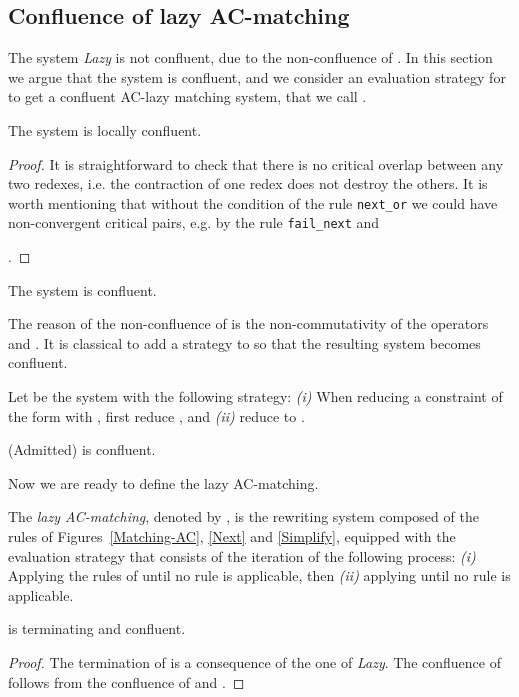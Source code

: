 \documentclass[submission,copyright,creativecommons]{eptcs}
\newcommand \lazy{}
\numberwithin{subcase}{case}
\begin{document}
\subsection{Confluence of lazy AC-matching}
\label{confluence:sec}
The system \textit{Lazy} is not confluent, due to the non-confluence of
. In this section we argue that the system  is confluent, and we consider an evaluation strategy
for  to  get a confluent AC-lazy matching system, that we call \lazy.

\begin{proposition}
The system  is locally confluent.
\end{proposition}
\begin{proof}
It is straightforward to check that there is no critical  overlap between 
 any two redexes, i.e. the contraction of one redex does not destroy the others. 
It is worth mentioning that without the  condition  
  of the rule \texttt{next\_or} 
we could have non-convergent critical pairs, e.g.
 by the rule 
\texttt{fail\_next} and  
   
   .
\end{proof}

\begin{corollary}
The system 
is confluent. 
\end{corollary}

 The reason of the non-confluence of 
  is the non-commutativity 
of the operators  and .
It is classical to add a strategy to 
so that the resulting system becomes confluent.
\begin{definition}
Let   be the system  
 with the following strategy: 
\textit{(i)} When reducing a constraint of the 
form  with , first reduce
 , and 
\textit{(ii)}  reduce 
  to 
.
\end{definition}
\begin{proposition}(Admitted)
 is  confluent.
\end{proposition}
Now we are ready to define the lazy AC-matching.
\begin{definition}
\label{ac:conf:lazy:def}
The \emph{lazy AC-matching}, denoted by \lazy, is the
rewriting system  composed of the 
 rules of Figures~\ref{Matching-AC}, \ref{Next} and
 \ref{Simplify}, equipped with the evaluation strategy  
that consists of the iteration of the following process:
\emph{(i)} Applying the rules of  until no
rule is applicable, then \emph{(ii)} applying   
until no rule  is applicable.
\end{definition}

\begin{theorem}
\label{lazy:term:conf:th}
 \lazy is terminating  and confluent.
\end{theorem}
\begin{proof}
The termination of \lazy is a consequence of the one of \textit{Lazy}. The 
confluence of \lazy follows from the  confluence of  and .
\end{proof}
\end{document}
